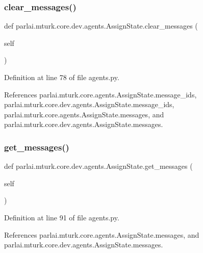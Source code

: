 \subsubsection{\texorpdfstring{clear\+\_\+messages()}{clear\_messages()}}
{\footnotesize\ttfamily def parlai.\+mturk.\+core.\+dev.\+agents.\+Assign\+State.\+clear\+\_\+messages (\begin{DoxyParamCaption}\item[{}]{self }\end{DoxyParamCaption})}



Definition at line 78 of file agents.\+py.



References parlai.\+mturk.\+core.\+agents.\+Assign\+State.\+message\+\_\+ids, parlai.\+mturk.\+core.\+dev.\+agents.\+Assign\+State.\+message\+\_\+ids, parlai.\+mturk.\+core.\+agents.\+Assign\+State.\+messages, and parlai.\+mturk.\+core.\+dev.\+agents.\+Assign\+State.\+messages.

\mbox{\label{classparlai_1_1mturk_1_1core_1_1dev_1_1agents_1_1AssignState_ac1b318dcae3eda8038a3ccaacdef4327}} 
\subsubsection{\texorpdfstring{get\+\_\+messages()}{get\_messages()}}
{\footnotesize\ttfamily def parlai.\+mturk.\+core.\+dev.\+agents.\+Assign\+State.\+get\+\_\+messages (\begin{DoxyParamCaption}\item[{}]{self }\end{DoxyParamCaption})}



Definition at line 91 of file agents.\+py.



References parlai.\+mturk.\+core.\+agents.\+Assign\+State.\+messages, and parlai.\+mturk.\+core.\+dev.\+agents.\+Assign\+State.\+messages.

\mbox{\label{classparlai_1_1mturk_1_1core_1_1dev_1_1agents_1_1AssignState_a148aa78f43e6d050c29368b8c2aaf0a6}} 
